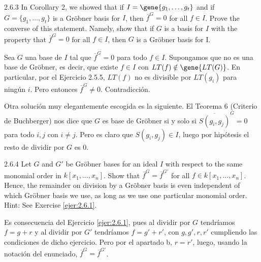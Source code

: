 \documentclass[twoside]{article}
\begin{document}
\begin{ejercicio}{2.6.3}
In Corollary 2, we showed that if $I =\gene{ 
g_1,\dots , g_t}$ and if $G = \{g_1,\dots , g_t\}$ is a Gröbner
basis for $I$, then $\overline{f}^G = 0$ for all $f ∈ I$. Prove the converse of this statement. Namely, show
that if $G$ is a basis for $I$ with the property that $\overline{f}^G = 0$ for all $f ∈ I$, then $G$ is a Gröbner
basis for I.

\end{ejercicio}
\begin{solucion}
Sea $G$ una base de $I$ tal que $\overline{f}^G=0$ para todo $f\in I$. Supongamos que no es una base de Gröbner, es decir, que existe $f\in I$ con $LT(f)\notin \gene{LT(G)}$. En particular, por el Ejercicio 2.5.5, $LT(f)$ no es divisible por $LT(g_i)$ para ningún $i$. Pero entonces $\overline{f}^G \neq 0$. Contradicción.

Otra solución muy elegantemente escogida es la siguiente. El Teorema 6 (Criterio de Buchberger) nos dice que $G$ es base de Gröbner si y solo si $\overline{S(g_i,g_j)}^G=0$ para todo $i,j$ con $i\neq j$. Pero es claro que $S(g_i,g_j)\in I$, luego por hipótesis el resto de dividir por $G$ es $0$.
\end{solucion}

\newpage

\begin{ejercicio}{2.6.4}
Let $G$ and $G'$ be Gröbner bases for an ideal $I$ with respect to the same monomial order
in $k[x_1,\dots , x_n]$. Show that $\overline{f}^G = \overline{f}^{G'}$
for all $f ∈ k[x_1,\dots , x_n]$. Hence, the remainder on
division by a Gröbner basis is even independent of which Gröbner basis we use, as long
as we use one particular monomial order. Hint: See Exercise \ref{ejer:2.6.1}.
\end{ejercicio}
\begin{solucion}
Es consecuencia del Ejercicio \ref{ejer:2.6.1}, pues al dividir por $G$ tendríamos $f=g+r$ y al dividir por $G'$ tendríamos $f=g'+r'$, con $g,g',r,r'$ cumpliendo las condiciones de dicho ejercicio. Pero por el apartado b, $r=r'$, luego, usando la notación del enunciado, $\overline{f}^G = \overline{f}^{G'}$.
\end{solucion}
\newpage
\end{document}
